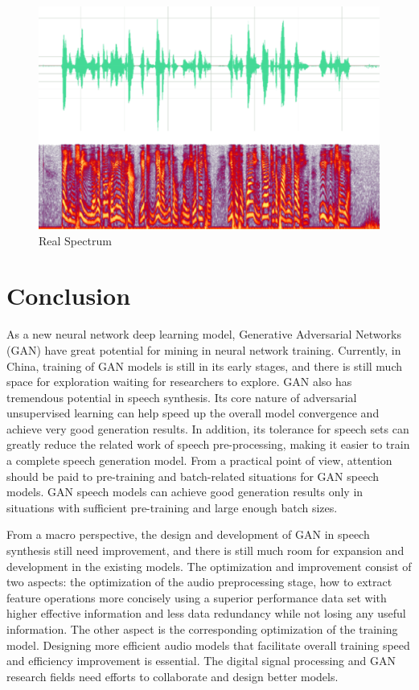 \documentclass[10pt,journal,compsoc]{IEEEtran}
\begin{document}
\begin{figure}
    \centering
    \includegraphics[scale=0.6] {PNG/4-9.png}
    \caption{Real Spectrum}
    \label{fig:4-9}
\end{figure}

\section{Conclusion}

As a new neural network deep learning model, Generative Adversarial Networks (GAN) have great potential for mining in neural network training. Currently, in China, training of GAN models is still in its early stages, and there is still much space for exploration waiting for researchers to explore. GAN also has tremendous potential in speech synthesis. Its core nature of adversarial unsupervised learning can help speed up the overall model convergence and achieve very good generation results. In addition, its tolerance for speech sets can greatly reduce the related work of speech pre-processing, making it easier to train a complete speech generation model. From a practical point of view, attention should be paid to pre-training and batch-related situations for GAN speech models. GAN speech models can achieve good generation results only in situations with sufficient pre-training and large enough batch sizes.

From a macro perspective, the design and development of GAN in speech synthesis still need improvement, and there is still much room for expansion and development in the existing models. The optimization and improvement consist of two aspects: the optimization of the audio preprocessing stage, how to extract feature operations more concisely using a superior performance data set with higher effective information and less data redundancy while not losing any useful information. The other aspect is the corresponding optimization of the training model. Designing more efficient audio models that facilitate overall training speed and efficiency improvement is essential. The digital signal processing and GAN research fields need efforts to collaborate and design better models.

\begin{CJK}{UTF8}{gbsn}




\end{CJK}
\end{document}
